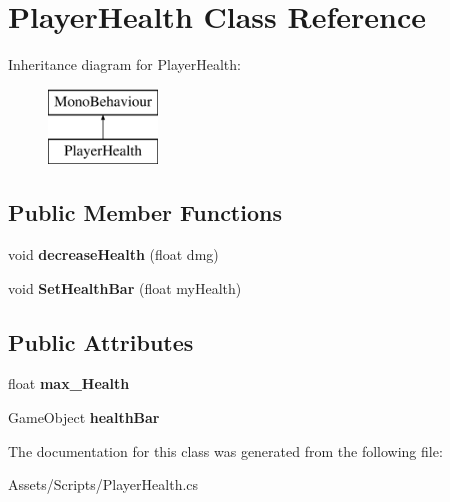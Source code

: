 \hypertarget{class_player_health}{}\section{Player\+Health Class Reference}
\label{class_player_health}
Inheritance diagram for Player\+Health\+:\begin{figure}[H]
\begin{center}
\leavevmode
\includegraphics[height=2.000000cm]{class_player_health}
\end{center}
\end{figure}
\subsection*{Public Member Functions}
\begin{DoxyCompactItemize}
\item 
void {\bfseries decrease\+Health} (float dmg)\hypertarget{class_player_health_aa496009bbd761011fdac86f070deaa18}{}\label{class_player_health_aa496009bbd761011fdac86f070deaa18}

\item 
void {\bfseries Set\+Health\+Bar} (float my\+Health)\hypertarget{class_player_health_a3846c3773f237618f3a5bbbe1e1ae203}{}\label{class_player_health_a3846c3773f237618f3a5bbbe1e1ae203}

\end{DoxyCompactItemize}
\subsection*{Public Attributes}
\begin{DoxyCompactItemize}
\item 
float {\bfseries max\+\_\+\+Health}\hypertarget{class_player_health_a5bd2cfbe75c653125f0d50db46a18be0}{}\label{class_player_health_a5bd2cfbe75c653125f0d50db46a18be0}

\item 
Game\+Object {\bfseries health\+Bar}\hypertarget{class_player_health_a9e05e6010af085577184984d05578eb8}{}\label{class_player_health_a9e05e6010af085577184984d05578eb8}

\end{DoxyCompactItemize}


The documentation for this class was generated from the following file\+:\begin{DoxyCompactItemize}
\item 
Assets/\+Scripts/Player\+Health.\+cs\end{DoxyCompactItemize}

